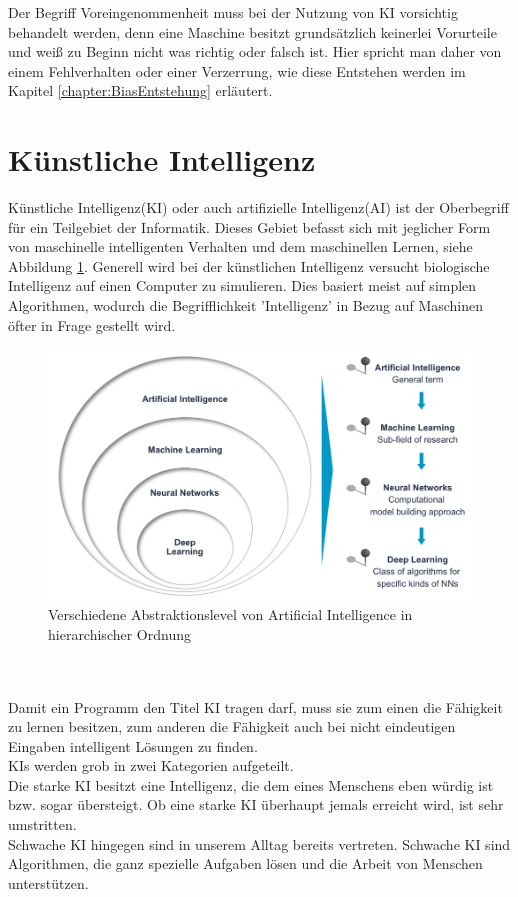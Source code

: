 \documentclass[12pt,oneside,a4paper,parskip]{scrbook}
\begin{document}
Der Begriff Voreingenommenheit muss bei der Nutzung von KI vorsichtig behandelt werden, denn eine Maschine besitzt grundsätzlich keinerlei Vorurteile und weiß zu Beginn nicht was richtig oder falsch ist. Hier spricht man daher von einem Fehlverhalten oder einer Verzerrung, wie diese Entstehen werden im Kapitel \ref{chapter:BiasEntstehung} erläutert.
\section{Künstliche Intelligenz}
Künstliche Intelligenz(KI) oder auch artifizielle Intelligenz(AI) ist der Oberbegriff für ein Teilgebiet der Informatik. Dieses Gebiet befasst sich mit jeglicher Form von maschinelle intelligenten Verhalten und dem maschinellen Lernen, siehe Abbildung \ref{fig:Uebersicht}. Generell wird bei der künstlichen Intelligenz versucht biologische Intelligenz auf einen Computer zu simulieren. Dies basiert meist auf simplen Algorithmen, wodurch die Begrifflichkeit 'Intelligenz' in Bezug auf Maschinen öfter in Frage gestellt wird.
\begin{figure}[ht]
	\begin{center}
		\includegraphics[width=14cm]{Bilder/Abstraktionslevel_von_AI.jpg}
		\caption{Verschiedene Abstraktionslevel von Artificial Intelligence in hierarchischer Ordnung}
		\label{fig:Uebersicht}
	\end{center}
\end{figure}
\\\\Damit ein Programm den Titel KI tragen darf, muss sie zum einen die Fähigkeit zu lernen besitzen, zum anderen die Fähigkeit auch bei nicht eindeutigen Eingaben intelligent Lösungen zu finden.\\
KIs werden grob in zwei Kategorien aufgeteilt.\\
Die starke KI besitzt eine Intelligenz, die dem eines Menschens eben würdig ist bzw. sogar übersteigt. Ob eine starke KI überhaupt jemals erreicht wird, ist sehr umstritten. \\Schwache KI hingegen sind in unserem Alltag bereits vertreten. Schwache KI sind Algorithmen, die ganz spezielle Aufgaben lösen und die Arbeit von Menschen unterstützen.
\end{document}
